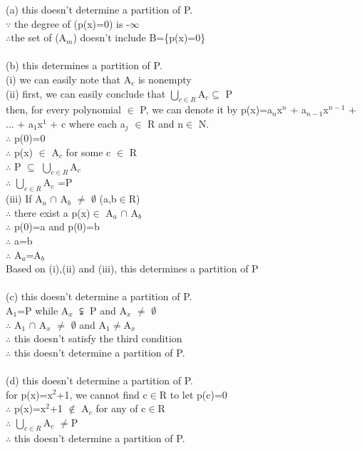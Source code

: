 \documentclass[11pt, a4paper, UTF8]{ctexart}
\begin{document}
\begin{solution}
(a) this doesn't determine a partition of P.\\
$\because$ the degree of (p(x)=0) is -$\infty$\\
$\therefore$the set of (A$_m$) doesn't include B=\{p(x)=0\}\\
\\
(b) this determines a partition of P.\\
(i) we can easily note that A$_c$ is nonempty\\
(ii) first, we can easily conclude that $\bigcup_{c\in R}$A$_c$$\subseteq$ P\\
then, for every polynomial $\in$ P, we can denote it by p(x)=a$_n$x$^n$ + a$_{n-1}$x$^{n-1}$ + ... + a$_1$x$^1$ + c where each a$_j$ $\in$ R and n$\in$ N.\\
$\therefore$ p(0)=0\\
$\therefore$ p(x) $\in$ A$_c$ for some c $\in$ R\\
$\therefore$ P $\subseteq$ $\bigcup_{c\in R}$A$_c$\\
$\therefore$ $\bigcup_{c\in R}$A$_c$ =P\\
(iii) If A$_a$ $\cap$ A$_b$ $\not=$ $\emptyset$ (a,b$\in$R)\\
$\therefore$ there exist a p(x)$\in$ A$_a$ $\cap$ A$_b$\\
$\therefore$ p(0)=a and p(0)=b\\
$\therefore$ a=b\\
$\therefore$ A$_a$=A$_b$\\
Based on (i),(ii) and (iii), this determines a partition of P\\
\\
(c) this doesn't determine a partition of P.\\
A$_{1}$=P while A$_{x}$ $\subsetneqq$ P and A$_{x}$ $\not=$ $\emptyset$\\
$\therefore$ A$_{1}$ $\cap$ A$_{x}$ $\not=$ $\emptyset$ and A$_{1}$$\not=$A$_{x}$\\
$\therefore$ this doesn't satisfy the third condition\\
$\therefore$ this doesn't determine a partition of P.\\
\\
(d) this doesn't determine a partition of P.\\
for p(x)=x$^2$+1, we cannot find c$\in$R to let p(c)=0\\
$\therefore$ p(x)=x$^2$+1 $\notin$ A$_c$ for any of c$\in$R\\
$\therefore$ $\bigcup_{c\in R}$A$_c$ $\not=$P\\
$\therefore$ this doesn't determine a partition of P.\\
\end{solution}
\end{document}
